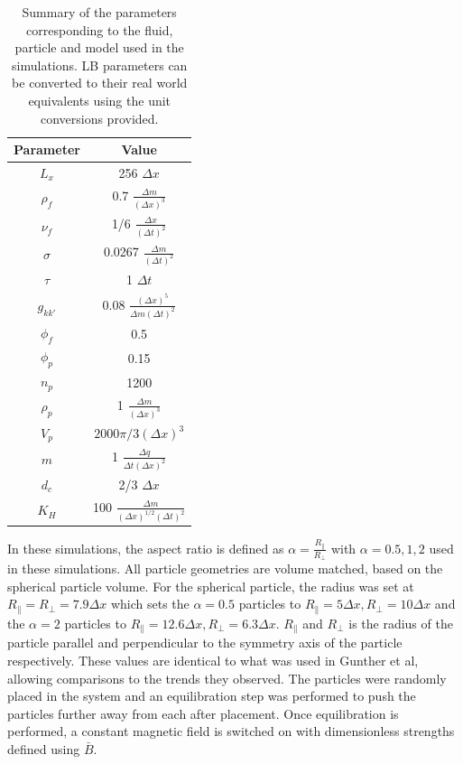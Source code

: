 \begin{table}
    \centering
    \caption{Summary of the parameters corresponding to the fluid, particle and model used in the simulations. 
             LB parameters can be converted to their real world equivalents using the unit conversions provided.}
    \label{table:model_params}
    \begin{tabular}{|c|c|}
    \hline
    Parameter & Value \\ [0.5ex] 
    \hline\hline
    $L_x$ & 256 $\Delta x$ \\
    $\rho_f$ & 0.7 $ \frac{\Delta m}{(\Delta x)^3}$\\
    $\nu_f$ & 1/6 $\frac{\Delta x}{(\Delta t)^2}$ \\
    $\sigma $ & 0.0267 $\frac{\Delta m}{(\Delta t)^2}$ \\
    $\tau$ & 1 $\Delta t$\\
    $g_{kk'}$ & 0.08 $\frac{(\Delta x)^5}{\Delta m(\Delta t)^2}$\\
    $\phi_f$ & 0.5 \\
    $\phi_p$ & 0.15 \\
    $n_p$ & 1200 \\
    $\rho_p$ & 1 $ \frac{\Delta m}{(\Delta x)^3}$\\
    $V_p$ & $2000\pi/3 (\Delta x)^3$ \\
    $m$ & 1 $\frac{\Delta q}{\Delta t(\Delta x)^2}$\\
    $d_c$ & 2/3 $\Delta x$ \\
    $K_H$ & 100 $\frac{\Delta m}{(\Delta x)^{1/2}(\Delta t)^2} $\\
    \hline
    \end{tabular}
\end{table}


In these simulations, the aspect ratio is defined as $\alpha = \frac{R_{\parallel}}{R_{\perp}}$ with $\alpha = 0.5, 1, 2$ 
used in these simulations. All particle geometries are volume matched, based on the spherical particle volume. For the 
spherical particle, the radius was set at $R_{\parallel} = R_{\perp} = 7.9 \Delta x$ which sets the $\alpha = 0.5$ particles to 
$R_{\parallel} = 5 \Delta x, R_{\perp} = 10 \Delta x$ and the $\alpha = 2$ particles to $R_{\parallel} = 12.6 \Delta x, R_{\perp} = 6.3 \Delta x$. 
$R_{\parallel}$ and $R_{\perp}$ is the radius of the particle parallel and perpendicular to the symmetry axis of 
the particle respectively. These values are identical to what was used in Gunther et al, allowing comparisons to the 
trends they observed. \cite{gunther_timescales_2014} The particles were randomly placed in the system and an equilibration
step was performed to push the particles further away from each after placement. Once equilibration is performed, a 
constant magnetic field is switched on with dimensionless strengths defined using $\bar{B}$.

